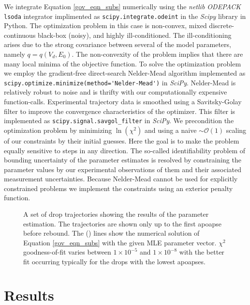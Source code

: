 \documentclass[aip,reprint, floatfix]{revtex4-1}
\begin{document}
We integrate Equation \ref{gov_eqn_subs} numerically using the \emph{netlib ODEPACK} \verb|lsoda| integrator implimented as \verb|scipy.integrate.odeint| in the \emph{Scipy} \cite{oliphant_python_2007} library in Python. The optimization problem in this case is non-convex, mixed discrete-continuous black-box (noisy), and highly ill-conditioned. The ill-conditioning arises due to the strong covariance between several of the model parameters, namely $q=q(V_d, E_0)$. The non-convexity of the problem implies that there are many local minima of the objective function. To solve the optimization problem we employ the gradient-free direct-search Nelder-Mead \cite{nelder_simplex_1965} algorithm implemented as \verb|scipy.optimize.minimize(method='Nelder-Mead')| in \emph{SciPy}. Nelder-Mead is relatively robust to noise and is thrifty with our computationally expensive function-calls. Experimental trajectory data is smoothed using a Savitsky-Golay filter \cite{savitzky_smoothing_1964} to improve the convergence characteristics of the optimizer. This filter is implemented as \verb|scipy.signal.savgol_filter| in \emph{SciPy}. We precondition the optimization problem by minimizing $\ln(\chi^2)$ and using a naive $\sim \mathcal{O}(1)$ scaling of our constraints by their initial guesses. Here the goal is to make the problem equally sensitive to steps in any direction. The so-called identifiability problem of bounding uncertainty of the parameter estimates is resolved by constraining the parameter values by our experimental observations of them and their associated measurement uncertainties. Because Nelder-Mead cannot be used for explicitly constrained problems we implement the constraints using an exterior penalty function.

\begin{figure}[h]
    \centering
    \resizebox{0.5\textwidth}{!}{}
    \caption{A set of drop trajectories showing the results of the parameter estimation. The trajectories are shown only up to the first apoapse before rebound. The (\protect\redline) \hspace{0.25 mm} lines show the numerical solution of Equation \ref{gov_eqn_subs} with the given MLE parameter vector. $\chi^2$ goodness-of-fit varies between $1 \times 10^{-5}$ and $1 \times 10^{-8}$ with the better fit occurring typically for the drops with the lowest apoapses.}
    \label{fig:inverse_problem}
\end{figure}

\section{Results}
\end{document}

